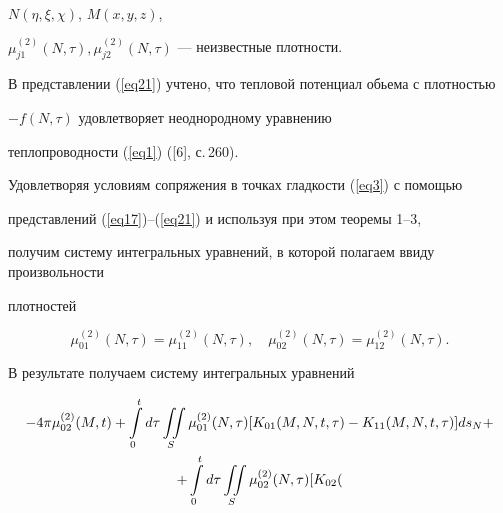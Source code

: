 \begin{pf}
\begin{align*}
\end{align*}


$N ({\eta ,\xi ,\chi})$, $M ({x,y,z})$,


$\mu_{j1}^{({2})} ({N,\tau}),\mu_{j2}^{(


{2})} ({N,\tau})$ --- неизвестные плотности.











В представлении (\ref{eq21}) учтено, что тепловой потенциал обьема с плотностью


$-f ({N,\tau})$ удовлетворяет неоднородному уравнению 


теплопроводности (\ref{eq1}) ([6], с.\,260).





Удовлетворяя условиям сопряжения в точках гладкости (\ref{eq3}) с помощью 


представлений (\ref{eq17})--(\ref{eq21}) и используя при этом теоремы 1--3,


получим систему интегральных уравнений, в которой полагаем ввиду произвольности 


плотностей


\begin{equation*}




\mu_{01}^{({2})} ({N,\tau})=\mu_{11}^{(


{2})} ({N,\tau}),\quad \mu_{02}^{({2})} (


{N,\tau})=\mu_{12}^{({2})} ({N,\tau}).


\end{equation*}


В результате получаем систему интегральных уравнений


\begin{gather}


-4\pi \mu_{02}^{({2})} ({M,t})+


\int\limits_{0}^{t} {} d\tau \iint\limits_{S} {} \mu_{01}^{({2})}


({N,\tau}) [{K_{01} ({M,N,t,\tau} )-K_{11} ({M,N,t,\tau})}]ds_{N}+\notag \\


%


+\int\limits_{0}^{t} {} d\tau \iint\limits_{S} {} \mu 


_{02}^{({2})} ({N,\tau}) [{K_{02} (


}
\end{gather}
\end{pf}
